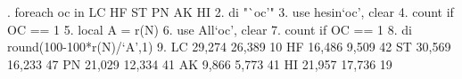 . foreach oc in LC HF ST PN AK HI {\lbr}
  2. di "`oc'"
  3. use hesin`oc', clear
  4. count if OC == 1
  5. local A = r(N)
  6. use All`oc', clear
  7. count if OC == 1
  8. di round(100-100*r(N)/`A',1)
  9. {\rbr}
LC
  29,274
  26,389
10
HF
  16,486
  9,509
42
ST
  30,569
  16,233
47
PN
  21,029
  12,334
41
AK
  9,866
  5,773
41
HI
  21,957
  17,736
19
{\smallskip}
